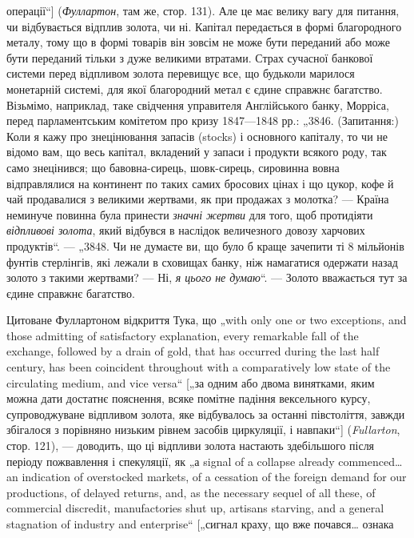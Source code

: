 операції“] (\emph{Фуллартон}, там же, стор. 131). Але це має велику
вагу для питання, чи відбувається відплив золота, чи ні. Капітал
передається в формі благородного металу, тому що в формі
товарів він зовсім не може бути переданий або може бути
переданий тільки з дуже великими втратами. Страх сучасної
банкової системи перед відпливом золота перевищує все, що
будьколи марилося монетарній системі, для якої благородний
метал є єдине справжнє багатство. Візьмімо, наприклад, таке
свідчення управителя Англійського банку, Морріса, перед парламентським
комітетом про кризу 1847—1848 рр.: „3846. (Запитання:)
Коли я кажу про знецінювання запасів (stocks) і основного
капіталу, то чи не відомо вам, що весь капітал, вкладений у запаси
і продукти всякого роду, так само знецінився; що бавовна-сирець,
шовк-сирець, сировинна вовна відправлялися на континент
по таких самих бросових цінах і що цукор, кофе й чай продавалися
з великими жертвами, як при продажах з молотка? — Країна
неминуче повинна була принести \emph{значні жертви} для того, щоб
протидіяти \emph{відпливові золота}, який відбувся в наслідок величезного
довозу харчових продуктів“. — „3848. Чи не думаєте
ви, що було б краще зачепити ті 8 мільйонів фунтів стерлінгів, які
лежали в сховищах банку, ніж намагатися одержати назад золото
з такими жертвами? — Ні, \emph{я цього не думаю}“. — Золото вважається
тут за єдине справжнє багатство.

Цитоване Фуллартоном відкриття Тука, що „with only one
or two exceptions, and those admitting of satisfactory explanation,
every remarkable fall of the exchange, followed by a drain of gold,
that has occurred during the last half century, has been coincident
throughout with a comparatively low state of the circulating medium,
and vice versa“ [„за одним або двома винятками, яким
можна дати достатнє пояснення, всяке помітне падіння вексельного
курсу, супроводжуване відпливом золота, яке відбувалось
за останні півстоліття, завжди збігалося з порівняно низьким
рівнем засобів циркуляції, і навпаки“] (\emph{Fullarton}, стор. 121), —
доводить, що ці відпливи золота настають здебільшого після періоду
пожвавлення і спекуляції, як „а signal of a collapse already
commenced\dots{} an indication of overstocked markets, of a cessation
of the foreign demand for our productions, of delayed returns, and,
as the necessary sequel of all these, of commercial discredit, manufactories
shut up, artisans starving, and a general stagnation of
industry and enterprise“ [„сигнал краху, що вже почався\dots{} ознака
\parbreak{}  %
